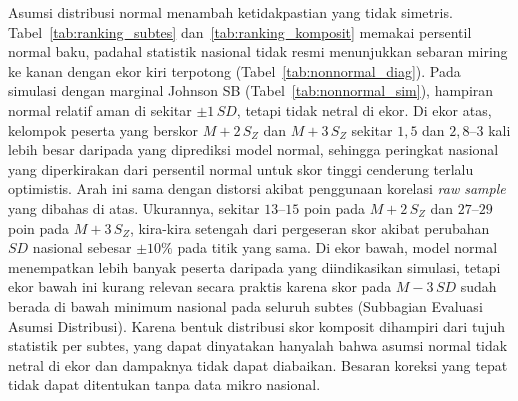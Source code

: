 Asumsi distribusi normal menambah ketidakpastian yang tidak simetris. Tabel~\ref{tab:ranking_subtes} dan~\ref{tab:ranking_komposit} memakai persentil normal baku, padahal statistik nasional tidak resmi menunjukkan sebaran miring ke kanan dengan ekor kiri terpotong (Tabel~\ref{tab:nonnormal_diag}). Pada simulasi dengan marginal Johnson SB (Tabel~\ref{tab:nonnormal_sim}), hampiran normal relatif aman di sekitar $\pm 1\,SD$, tetapi tidak netral di ekor. Di ekor atas, kelompok peserta yang berskor $M + 2\,S_Z$ dan $M + 3\,S_Z$ sekitar $1,5$ dan $2,8$--$3$ kali lebih besar daripada yang diprediksi model normal, sehingga peringkat nasional yang diperkirakan dari persentil normal untuk skor tinggi cenderung terlalu optimistis. Arah ini sama dengan distorsi akibat penggunaan korelasi \textit{raw sample} yang dibahas di atas. Ukurannya, sekitar $13$--$15$ poin pada $M + 2\,S_Z$ dan $27$--$29$ poin pada $M + 3\,S_Z$, kira-kira setengah dari pergeseran skor akibat perubahan $SD$ nasional sebesar $\pm 10\%$ pada titik yang sama. Di ekor bawah, model normal menempatkan lebih banyak peserta daripada yang diindikasikan simulasi, tetapi ekor bawah ini kurang relevan secara praktis karena skor pada $M - 3\,SD$ sudah berada di bawah minimum nasional pada seluruh subtes (Subbagian Evaluasi Asumsi Distribusi). Karena bentuk distribusi skor komposit dihampiri dari tujuh statistik per subtes, yang dapat dinyatakan hanyalah bahwa asumsi normal tidak netral di ekor dan dampaknya tidak dapat diabaikan. Besaran koreksi yang tepat tidak dapat ditentukan tanpa data mikro nasional.